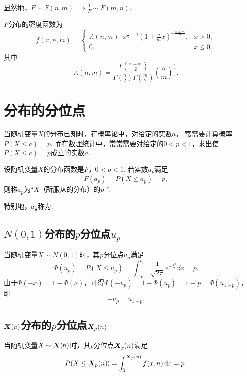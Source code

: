 显然地，\(F \sim F(n,m) \implies \frac{1}{F} \sim F(m,n)\).

\begin{theorem}
\(F\)分布的密度函数为\begin{equation}
	f(x,n,m) = \left\{ \begin{array}{cl}
		A(n,m) \cdot x^{\frac{n}{2}-1}
		\left(1+\frac{n}{m}x\right)^{-\frac{n+m}{2}},
		& x > 0, \\
		0, & x \leq 0,
	\end{array} \right.
\end{equation}
其中\[
	A(n,m)=\frac{
		\Gamma\left(\frac{n+m}{2}\right)
	}{
		\Gamma\left(\frac{n}{2}\right) \Gamma\left(\frac{m}{2}\right)
	}
	\left(\frac{n}{m}\right)^{\frac{n}{2}}.
\]
\end{theorem}

\section{分布的分位点}
当随机变量\(X\)的分布已知时，在概率论中，对给定的实数\(a\)，
常需要计算概率\(P(X \leq a) = p\).
而在数理统计中，常常需要对给定的\(0<p<1\)，求出使\(P(X \leq a) = p\)成立的实数\(a\).

\begin{definition}
设随机变量\(X\)的分布函数是\(F\)，\(0<p<1\).
若实数\(a_p\)满足\[
	F(a_p) = P(X \leq a_p) = p,
\]
则称\(a_p\)为“\(X\)（所服从的分布）的\(p\) ”.

特别地，\(a_{\frac{1}{2}}\)称为.
\end{definition}

\subsection{\texorpdfstring{\(N(0,1)\)分布的\(p\)分位点\(u_p\)}{标准正态分布的p分位点}}
当随机变量\(X \sim N(0,1)\)时，其\(p\)分位点\(u_p\)满足\[
\Phi(u_p)
= P(X \leq u_p)
= \int_{-\infty}^{u_p} \frac{1}{\sqrt{2\pi}} e^{-\frac{x^2}{2}} \dd{x}
= p.
\]由于\(\Phi(-x)=1-\Phi(x)\)，可得\(\Phi(-u_p)=1-\Phi(u_p)=1-p=\Phi(u_{1-p})\)，即\begin{equation}
-u_p=u_{1-p}.
\end{equation}

\subsection{\texorpdfstring{\(\boldsymbol{X}(n)\)分布的\(p\)分位点\(\boldsymbol{X}_p(n)\)}{卡方分布的p分位点}}
当随机变量\(X \sim \boldsymbol{X}(n)\)时，其\(p\)分位点\(\boldsymbol{X}_p(n)\)满足\[
P(X \leq \boldsymbol{X}_p(n)) = \int_0^{\boldsymbol{X}_p(n)} f(x,n) \dd{x} = p.
\]

